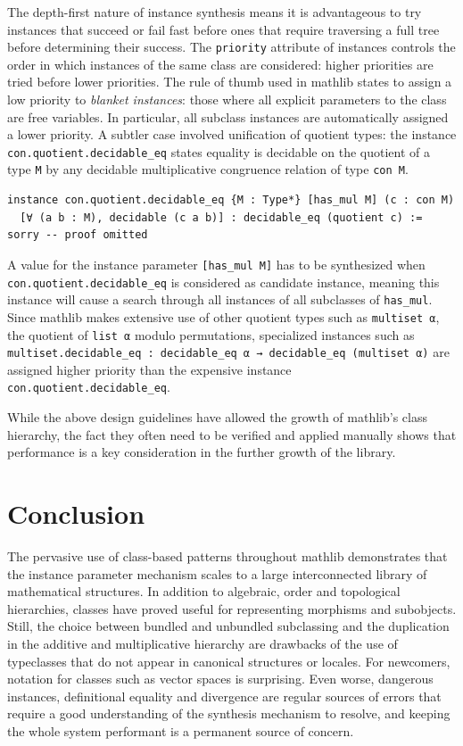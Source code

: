 \documentclass[a4paper,UKenglish,cleveref, autoref, thm-restate]{lipics-v2021}
\newcommand{\mathlib}{\textsf{mathlib}\xspace}
\begin{document}
The depth-first nature of instance synthesis means it is advantageous to try instances that succeed or fail fast
before ones that require traversing a full tree before determining their success.
The \lstinline{priority} attribute of instances controls the order in which instances of the same class are considered:
higher priorities are tried before lower priorities.
The rule of thumb used in \mathlib states to assign a low priority to \emph{blanket instances}: those where all explicit parameters to the class are free variables.
In particular, all subclass instances are automatically assigned a lower priority.
A subtler case involved unification of quotient types:
the instance \lstinline{con.quotient.decidable_eq} states equality is decidable on the quotient of a type \lstinline{M} by any decidable multiplicative congruence relation of type \lstinline{con M}.
\begin{lstlisting}
instance con.quotient.decidable_eq {M : Type*} [has_mul M] (c : con M)
  [∀ (a b : M), decidable (c a b)] : decidable_eq (quotient c) :=
sorry -- proof omitted
\end{lstlisting}
A value for the instance parameter \lstinline{[has_mul M]} has to be synthesized when \lstinline{con.quotient.decidable_eq} is considered as candidate instance,
meaning this instance will cause a search through all instances of all subclasses of \lstinline{has_mul}.
Since \mathlib makes extensive use of other quotient types such as \lstinline{multiset α}, the quotient of \lstinline{list α} modulo permutations,
specialized instances such as \lstinline{multiset.decidable_eq : decidable_eq α → decidable_eq (multiset α)} are assigned higher priority than the expensive instance \lstinline{con.quotient.decidable_eq}.

While the above design guidelines have allowed the growth of \mathlib's class hierarchy,
the fact they often need to be verified and applied manually shows that performance is a key consideration in the further growth of the library.

\section{Conclusion}

The pervasive use of class-based patterns throughout \mathlib demonstrates that the instance parameter mechanism scales to a large interconnected library of mathematical structures.
In addition to algebraic, order and topological hierarchies, classes have proved useful for representing morphisms and subobjects.
Still, the choice between bundled and unbundled subclassing and the duplication in the additive and multiplicative hierarchy are drawbacks of the use of typeclasses that do not appear in canonical structures or locales.
For newcomers, notation for classes such as vector spaces is surprising.
Even worse, dangerous instances, definitional equality and divergence are regular sources of errors that require a good understanding of the synthesis mechanism to resolve,
and keeping the whole system performant is a permanent source of concern.
\end{document}
